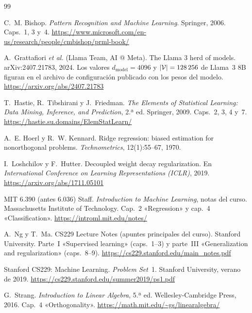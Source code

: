\begin{thebibliography}{99}
\small

C.~M. Bishop.
\newblock \emph{Pattern Recognition and Machine Learning}.
\newblock Springer, 2006.
\newblock Caps.~1, 3 y~4.
\newblock \url{https://www.microsoft.com/en-us/research/people/cmbishop/prml-book/}

A.~Grattafiori \emph{et al.} (Llama Team, AI @ Meta).
\newblock The Llama 3 herd of models.
\newblock arXiv:2407.21783, 2024.
\newblock Los valores $d_{\text{model}}=4096$ y $\lvert\mathcal{V}\rvert=128\,256$ de Llama~3 8B figuran en el archivo de configuración publicado con los pesos del modelo.
\newblock \url{https://arxiv.org/abs/2407.21783}

T.~Hastie, R.~Tibshirani y J.~Friedman.
\newblock \emph{The Elements of Statistical Learning: Data Mining, Inference, and Prediction}, 2.ª ed.
\newblock Springer, 2009.
\newblock Caps.~2, 3, 4 y~7.
\newblock \url{https://hastie.su.domains/ElemStatLearn/}

A.~E. Hoerl y R.~W. Kennard.
\newblock Ridge regression: biased estimation for nonorthogonal problems.
\newblock \emph{Technometrics}, 12(1):55--67, 1970.

I.~Loshchilov y F.~Hutter.
\newblock Decoupled weight decay regularization.
\newblock En \emph{International Conference on Learning Representations (ICLR)}, 2019.
\newblock \url{https://arxiv.org/abs/1711.05101}

MIT 6.390 (antes 6.036) Staff.
\newblock \emph{Introduction to Machine Learning}, notas del curso.
\newblock Massachusetts Institute of Technology. Cap.~2 «Regression» y cap.~4 «Classification».
\newblock \url{https://introml.mit.edu/notes/}

A.~Ng y T.~Ma.
\newblock CS229 Lecture Notes (apuntes principales del curso).
\newblock Stanford University. Parte~I «Supervised learning» (caps.~1--3) y parte~III «Generalization and regularization» (caps.~8--9).
\newblock \url{https://cs229.stanford.edu/main_notes.pdf}

Stanford CS229: Machine Learning.
\newblock \emph{Problem Set}~1.
\newblock Stanford University, verano de 2019.
\newblock \url{https://cs229.stanford.edu/summer2019/ps1.pdf}

G.~Strang.
\newblock \emph{Introduction to Linear Algebra}, 5.ª ed.
\newblock Wellesley-Cambridge Press, 2016.
\newblock Cap.~4 «Orthogonality».
\newblock \url{https://math.mit.edu/~gs/linearalgebra/}


\end{thebibliography}
